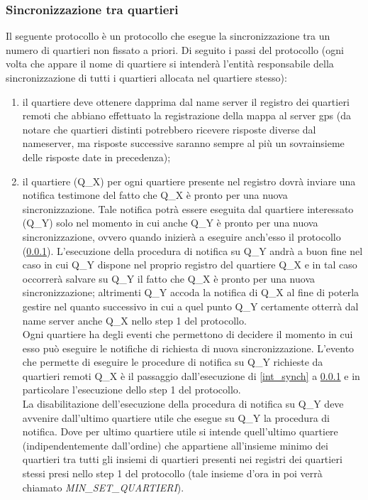 \subsubsection{Sincronizzazione tra quartieri}
\label{quart_synch}
Il seguente protocollo è un protocollo che esegue la sincronizzazione tra un numero di quartieri non fissato a priori. Di seguito i passi del protocollo (ogni volta che appare il nome di quartiere si intenderà l'entità responsabile della sincronizzazione di tutti i quartieri allocata nel quartiere stesso):
\begin{enumerate}
\item il quartiere deve ottenere dapprima dal name server il registro dei quartieri remoti che abbiano effettuato la registrazione della mappa al server gps (da notare che quartieri distinti potrebbero ricevere risposte diverse dal nameserver, ma risposte successive saranno sempre al più un sovrainsieme delle risposte date in precedenza);
\item il quartiere (Q\_X) per ogni quartiere presente nel registro dovrà inviare una notifica testimone del fatto che Q\_X è pronto per una nuova sincronizzazione. Tale notifica potrà essere eseguita dal quartiere interessato (Q\_Y) solo nel momento in cui anche Q\_Y è pronto per una nuova sincronizzazione, ovvero quando inizierà a eseguire anch'esso il protocollo (\ref{quart_synch}). L'esecuzione della procedura di notifica su Q\_Y andrà a buon fine nel caso in cui Q\_Y dispone nel proprio registro del quartiere Q\_X e in tal caso occorrerà salvare su Q\_Y il fatto che Q\_X è pronto per una nuova sincronizzazione; altrimenti Q\_Y accoda la notifica di Q\_X al fine di poterla gestire nel quanto successivo in cui a quel punto Q\_Y certamente otterrà dal name server anche Q\_X nello step 1 del protocollo. \\
Ogni quartiere ha degli eventi che permettono di decidere il momento in cui esso può eseguire le notifiche di richiesta di nuova sincronizzazione. L'evento che permette di eseguire le procedure di notifica su Q\_Y richieste da quartieri remoti Q\_X è il passaggio dall'esecuzione di \ref{int_synch} a \ref{quart_synch} e in particolare l'esecuzione dello step 1 del protocollo. \\ La disabilitazione dell'esecuzione della procedura di notifica su Q\_Y deve avvenire dall'ultimo quartiere utile che esegue su Q\_Y la procedura di notifica. Dove per ultimo quartiere utile si intende quell'ultimo quartiere (indipendentemente dall'ordine) che appartiene all'insieme minimo dei quartieri tra tutti gli insiemi di quartieri presenti nei registri dei quartieri stessi presi nello step 1 del protocollo (tale insieme d'ora in poi verrà chiamato \textit{MIN\_SET\_QUARTIERI}). \\

\end{enumerate}
